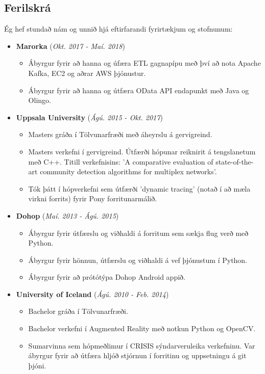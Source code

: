 \documentclass[10pt]{article}
\begin{document}
\begin{flushleft}
\newpage

\section*{Ferilskrá}
Ég hef stundað nám og unnið hjá eftirfarandi fyrirtækjum og stofnunum: \newline

\begin{itemize}
  \item \textbf{Marorka} (\textit{Okt. 2017 - Maí. 2018})
  \begin{itemize}
  \item Ábyrgur fyrir að hanna og úfæra ETL gagnapípu með því að nota Apache Kafka, EC2 og aðrar AWS þjónustur.
  \item Ábyrgur fyrir að hanna og útfæra OData API endapunkt með Java og Olingo.
  \end{itemize}
  \item \textbf{Uppsala University} (\textit{Ágú. 2015 - Okt. 2017})
  \begin{itemize}
  \item Masters gráða í Tölvunarfræði með áheyrslu á gervigreind.
  \item Masters verkefni í gervigreind. Útfærði hópunar reiknirit á tengslanetum með C++. Titill verkefnisins: 'A comparative evaluation of state-of-the-art community detection algorithms for multiplex networks'.
  \item Tók þátt í hópverkefni sem útfærði 'dynamic tracing' (notað í að mæla virkni forrits) fyrir Pony forritunarmálið.
  \end{itemize}
  \item \textbf{Dohop} (\textit{Maí. 2013 - Ágú. 2015})
  \begin{itemize}
  \item Ábyrgur fyrir útfærslu og viðhaldi á forritum sem sækja flug verð með Python.
  \item Ábyrgur fyrir hönnun, útfærslu og viðhaldi á vef þjónustum í Python.
  \item Ábyrgur fyrir að prótótýpa Dohop Android appið.
  \end{itemize}
  \item \textbf{University of Iceland} (\textit{Ágú. 2010 - Feb. 2014})
  \begin{itemize}
  \item Bachelor gráða í Tölvunarfræði.
  \item Bachelor verkefni í Augmented Reality með notkun Python og OpenCV.
  \item Sumarvinna sem hópmeðlimur í CRISIS sýndarveruleika verkefninu. Var ábyrgur fyrir að útfæra hljóð stjórnun í forritinu og uppsetningu á git þjóni. 
  \end{itemize}
\end{itemize}


\end{flushleft}
\end{document}

